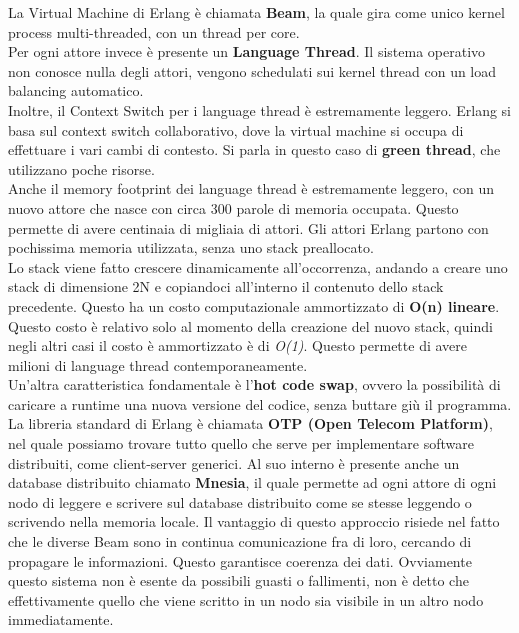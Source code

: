\documentclass{article}
\begin{document}
La Virtual Machine di Erlang è chiamata \textbf{Beam}, la quale gira come unico kernel process multi-threaded, con un thread per core.\\
Per ogni attore invece è presente un \textbf{Language Thread}. Il sistema operativo non conosce nulla degli attori, vengono schedulati sui kernel thread con un load balancing automatico.\vspace{14pt}\\
Inoltre, il Context Switch per i language thread è estremamente leggero. Erlang si basa sul context switch collaborativo, dove la virtual machine si occupa di effettuare i vari cambi di contesto. Si parla in questo caso di \textbf{green thread}, che utilizzano poche risorse.\vspace{14pt}\\
Anche il memory footprint dei language thread è estremamente leggero, con un nuovo attore che nasce con circa 300 parole di memoria occupata. Questo permette di avere centinaia di migliaia di attori. Gli attori Erlang partono con pochissima memoria utilizzata, senza uno stack preallocato.\\
Lo stack viene fatto crescere dinamicamente all'occorrenza, andando a creare uno stack di dimensione 2N e copiandoci all'interno il contenuto dello stack precedente. Questo ha un costo computazionale ammortizzato di \textbf{O(n) lineare}.\\
Questo costo è relativo solo al momento della creazione del nuovo stack, quindi negli altri casi il costo è ammortizzato è di \textit{O(1)}. Questo permette di avere milioni di language thread contemporaneamente.\vspace{14pt}\\
Un'altra caratteristica fondamentale è l'\textbf{hot code swap}, ovvero la possibilità di caricare a runtime una nuova versione del codice, senza buttare giù il programma.\vspace{14pt}\\
La libreria standard di Erlang è chiamata \textbf{OTP (Open Telecom Platform)}, nel quale possiamo trovare tutto quello che serve per implementare software distribuiti, come client-server generici. Al suo interno è presente anche un database distribuito chiamato \textbf{Mnesia}, il quale permette ad ogni attore di ogni nodo di leggere e scrivere sul database distribuito come se stesse leggendo o scrivendo nella memoria locale. Il vantaggio di questo approccio risiede nel fatto che le diverse Beam sono in continua comunicazione fra di loro, cercando di propagare le informazioni. Questo garantisce coerenza dei dati. Ovviamente questo sistema non è esente da possibili guasti o fallimenti, non è detto che effettivamente quello che viene scritto in un nodo sia visibile in un altro nodo immediatamente.
\end{document}
